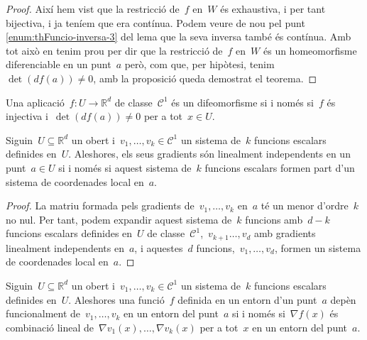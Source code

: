 \documentclass[../calcul-en-diverses-variables.tex]{subfiles}
\begin{document}
\begin{proof}
        Així hem vist que la restricció de~\(f\) en~\(W\) és exhaustiva, i per tant bijectiva, i ja teníem que era contínua.
        Podem veure de nou pel punt \eqref{enum:thFuncio-inversa-3} del lema  que la seva inversa també és contínua.
        Amb tot això en tenim prou per dir que la restricció de~\(f\) en~\(W\) és un homeomorfisme diferenciable en un punt~\(a\) però, com que, per hipòtesi, tenim~\(\det(df(a))\neq0\), amb la proposició  queda demostrat el teorema.
    \end{proof}
    \begin{corollary} %
        \label{cor:difeomorfisme-es-equivalent-a-ser-injectiva-i-tenir-diferencial-amb-determinant-no-nul}
        Una aplicació~\(f\colon U\to \mathbb{R}^{d}\) de classe~\(\mathcal{C}^{1}\) és un difeomorfisme si i només si~\(f\) és injectiva i~\(\det(df(a))\neq0\) per a tot~\(x\in U\).
    \end{corollary}
    \begin{proposition}
        Siguin~\(U\subseteq\mathbb{R}^{d}\) un obert i~\(v_{1},\dots,v_{k}\in\mathcal{C}^{1}\) un sistema de~\(k\) funcions escalars definides en~\(U\).
        Aleshores, els seus gradients són linealment independents en un punt~\(a\in U\) si i només si aquest sistema de~\(k\) funcions escalars formen part d'un sistema de coordenades local en~\(a\).
    \end{proposition}
    \begin{proof}
        La matriu formada pels gradients de~\(v_{1},\dots,v_{k}\) en~\(a\) té un menor d'ordre~\(k\) no nul.
        Per tant, podem expandir aquest sistema de~\(k\) funcions amb~\(d-k\) funcions escalars definides en~\(U\) de classe~\(\mathcal{C}^{1}\),~\(v_{k+1}\dots,v_{d}\) amb gradients linealment independents en~\(a\), i aquestes~\(d\) funcions,~\(v_{1},\dots,v_{d}\), formen un sistema de coordenades local en~\(a\).
    \end{proof}
    \begin{corollary}\label{corollary:dependencia-funcional-iff-dependencia-lineal-dels-gradients}
        Siguin~\(U\subseteq\mathbb{R}^{d}\) un obert i~\(v_{1},\dots,v_{k}\in\mathcal{C}^{1}\) un sistema de~\(k\) funcions escalars definides en~\(U\).
        Aleshores una funció~\(f\) definida en un entorn d'un punt~\(a\) depèn funcionalment de~\(v_{1},\dots,v_{k}\) en un entorn del punt~\(a\) si i només si~\(\nabla f(x)\) és combinació lineal de~\(\nabla v_{1}(x),\dots,\nabla v_{k}(x)\) per a tot~\(x\) en un entorn del punt~\(a\).
    \end{corollary}
\end{document}
